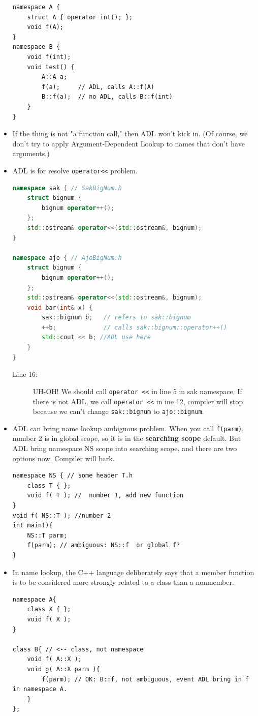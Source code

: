 \documentclass[a4paper,11pt,twoside]{book}
\begin{document}
\begin{itemize}
\begin{lstlisting}[numbers=none]
namespace A {
	struct A { operator int(); };
	void f(A);
}
namespace B {
	void f(int);
	void test() {
		A::A a;
		f(a);     // ADL, calls A::f(A)
		B::f(a);  // no ADL, calls B::f(int)
	}	
}
\end{lstlisting}

\item  If the thing is not "a function call," then ADL won't kick in. (Of course, we don't try to apply Argument-Dependent Lookup to names that don't have arguments.) 
	
\item ADL is for resolve \texttt{operator<<} problem.
\begin{lstlisting}[frame=single, language=c++]
namespace sak { // SakBigNum.h
	struct bignum {
		bignum operator++();
	};
	std::ostream& operator<<(std::ostream&, bignum); 
}

namespace ajo { // AjoBigNum.h
	struct bignum {
		bignum operator++();
	};
	std::ostream& operator<<(std::ostream&, bignum);
	void bar(int& x) {
		sak::bignum b;   // refers to sak::bignum
		++b;             // calls sak::bignum::operator++()
		std::cout << b; //ADL use here
	}
}
\end{lstlisting}
\begin{description}
	\item[Line 16:] UH-OH! We should call \texttt{operator <<} in line 5 in sak namespace. If there is not ADL, we call \texttt{operator <<} in ine 12, compiler will stop because we can't change \texttt{sak::bignum} to \texttt{ajo::bignum}.
\end{description}
	
	\item ADL can bring name lookup ambiguous problem.  When you call \texttt{f(parm)}, number 2 is in global scope, so it is in the \textbf{searching scope} default. But ADL bring namespace NS scope into searching scope, and there are two options now. Compiler will bark.
	
\begin{lstlisting}[numbers=none]
namespace NS { // some header T.h
	class T { };
	void f( T ); //  number 1, add new function
}
void f( NS::T ); //number 2	
int main(){
	NS::T parm;
	f(parm); // ambiguous: NS::f  or global f?
}
\end{lstlisting}
	
	
	\item In name lookup, the C++ language deliberately says that a member function is to be considered more strongly related to a class than a nonmember.
\begin{lstlisting}[numbers=none]
namespace A{
	class X { };
	void f( X );
}
	
class B{ // <-- class, not namespace
	void f( A::X );
	void g( A::X parm ){
		f(parm); // OK: B::f, not ambiguous, event ADL bring in f in namespace A.
	}
};
\end{lstlisting}
	
\end{itemize}
\end{document}
